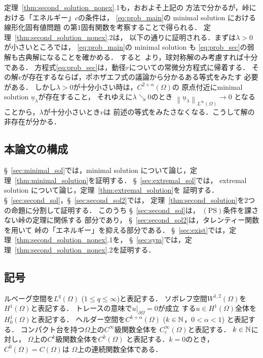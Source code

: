定理~\ref{thm:second_solution_nonex}.1も，おおよそ上記の
方法で分かるが，峠における「エネルギー」$c$の条件は，
\ref{eq:prob_main}の minimal solution における線形化固有値問題
の第$1$固有関数を考察することで得られる．
定理~\ref{thm:second_solution_nonex}.2は，
以下の通りに証明される．まずは$\lambda > 0$が小さいところでは，
\ref{eq:prob_main}の minimal solution も
\ref{eq:prob_sec}の弱解も古典解になることを確かめる．
すると\cite{MR544879}~より，球対称解のみ考慮すれば十分である．
方程式\ref{eq:prob_sec}は，動径$r$についての常微分方程式に帰着する．
その解$v$が存在するならば，ポホザエフ式の議論から分かるある等式をみたす
必要がある．
しかし$\lambda > 0$が十分小さい時は，$C^{2 + \alpha}(\Omega)$の
原点付近にminimal solution $\underline{u}_\lambda$が存在すること，
それゆえに$\lambda \searrow 0$のとき
$\left\| \underline{u}_\lambda \right\|_{L^\infty(\Omega)} \to 0$
となることから，$\lambda$が十分小さいとき$v$は
前述の等式をみたさなくなる．こうして解の非存在が分かる．

\subsection{本論文の構成}

\S~\ref{sec:minimal_sol}では，minimal solution について論じ，定
理~\ref{thm:minimal_solution}を証明する．
\S~\ref{sec:extremal_sol}では，
extremal solution について論じ，定理~\ref{thm:extremal_solution}を
証明する．
\S~\ref{sec:second_sol}，\S~\ref{sec:second_sol2}では，
定理~\ref{thm:second_solution}を$2$つの命題に分割して証明する．
このうち
\S~\ref{sec:second_sol}は，
$(\mathrm{PS})$条件を課さない峠の定理に関係する
部分であり，
\S~\ref{sec:second_sol2}は，タレンティー関数を用いて
峠の「エネルギー」を抑える部分である．
\S~\ref{sec:exist}では，定理~\ref{thm:second_solution_nonex}.1を，
\S~\ref{sec:sym}では，定理~\ref{thm:second_solution_nonex}.2を証明する．

\subsection{記号}

ルベーグ空間を$L^q(\Omega)$ ($1 \leq q \leq \infty$)と表記する．
ソボレフ空間$W^{1, 2}(\Omega)$を$H^1(\Omega)$と表記する．
トレースの意味で$u |_{\partial \Omega} = 0$が成立
する$u \in H^1(\Omega)$全体を$H_0^1(\Omega)$と表記する．
ヘルダー空間を$C^{k + \alpha}(\Omega)$ ($k \in \mathbb{N}$，$0 < \alpha < 1$)
と表記する．
コンパクト台を持つ$\Omega$上の$C^\infty$級関数全体を
$C^\infty_c (\Omega)$と表記する．
$k \in \mathbb{N}$に対し，
$\Omega$上の$C^k$級関数全体を$C^k(\Omega)$
と表記する．$k = 0$のとき，$C^0(\Omega) = C(\Omega)$は
$\Omega$上の連続関数全体である．

